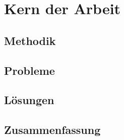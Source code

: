 \chapter{Kern der Arbeit}



\section{Methodik}

\section{Probleme}

\section{Lösungen}



\section{Zusammenfassung}
